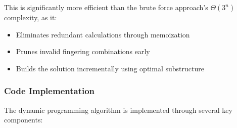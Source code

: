 \documentclass[conference]{IEEEtran}
\begin{document}
This is significantly more efficient than the brute force approach's \(\Theta(3^n)\) complexity, as it:
\begin{itemize}
    \item Eliminates redundant calculations through memoization
    \item Prunes invalid fingering combinations early
    \item Builds the solution incrementally using optimal substructure
\end{itemize}

\subsubsection{Code Implementation}
The dynamic programming algorithm is implemented through several key components:
\end{document}
